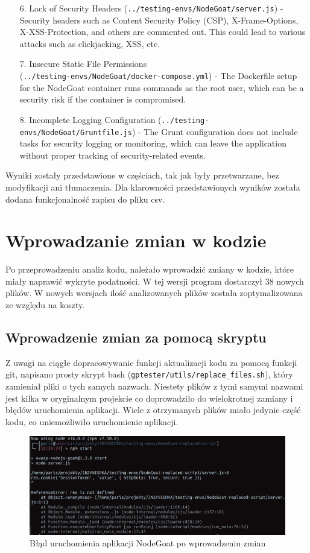 \begin{enumerate}
  \item[6.] Lack of Security Headers (\texttt{../testing-envs/NodeGoat/server.js}) - Security headers such as Content Security Policy (CSP), X-Frame-Options, X-XSS-Protection, and others are commented out. This could lead to various attacks such as clickjacking, XSS, etc.
  \item[7.] Insecure Static File Permissions \\(\texttt{../testing-envs/NodeGoat/docker-compose.yml}) - The Dockerfile setup for the NodeGoat container runs commands as the root user, which can be a security risk if the container is compromised.
  \item[8.] Incomplete Logging Configuration (\texttt{../testing-envs/NodeGoat/Gruntfile.js}) - The Grunt configuration does not include tasks for security logging or monitoring, which can leave the application without proper tracking of security-related events.
\end{enumerate}
Wyniki zostały przedstawione w częściach, tak jak były przetwarzane, bez modyfikacji ani tłumaczenia. Dla klarowności przedstawionych wyników została dodana funkcjonalność zapisu do pliku csv.

\section{Wprowadzanie zmian w kodzie}
Po przeprowadzeniu analiz kodu, należało wprowadzić zmiany w kodzie, które miały naprawić wykryte podatności. W tej wersji program dostarczył 38 nowych plików. W nowych wersjach ilość analizowanych plików została zoptymalizowana ze względu na koszty.
\subsection{Wprowadzenie zmian za pomocą skryptu}
Z uwagi na ciągłe dopracowywanie funkcji aktualizacji kodu za pomocą funkcji git, napisano prosty skrypt bash (\texttt{gptester/utils/replace\_files.sh}), który zamieniał pliki o tych samych nazwach. Niestety plików z tymi samymi nazwami jest kilka w oryginalnym projekcie co doprowadziło do wielokrotnej zamiany i błędów uruchomienia aplikacji. Wiele z otrzymanych plików miało jedynie część kodu, co uniemożliwiło uruchomienie aplikacji.

\begin{figure}[H]
  \centering
  \includegraphics[width=\linewidth]{img/npm-start-error.png}
  \caption{Błąd uruchomienia aplikacji NodeGoat po wprowadzeniu zmian}
  \label{fig:nodegoat-error-after}
\end{figure}

